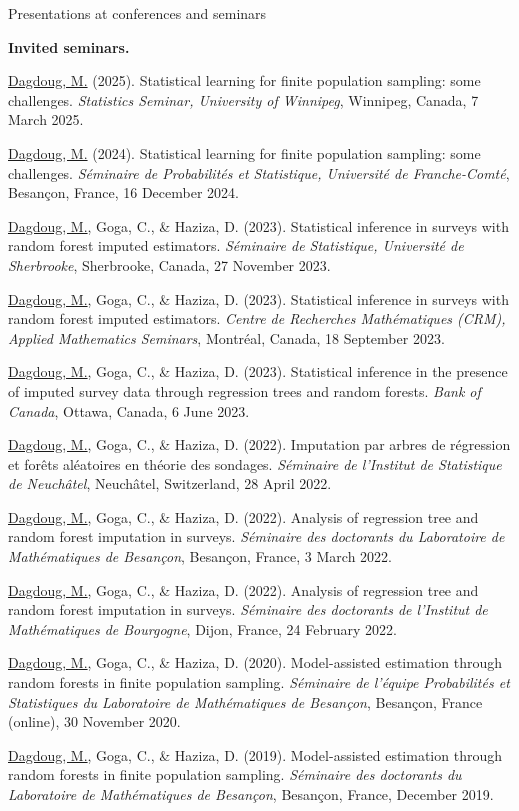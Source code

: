 \documentclass{resume}
\begin{document}
\begin{rSection}{Presentations at conferences and seminars}
\vspace{1mm}\hrulefill\vspace{1mm}

\textbf{Invited seminars.}
\begin{etaremune}
  \item \underline{Dagdoug, M.} (2025). Statistical learning for finite population sampling: some challenges. \textit{Statistics Seminar, University of Winnipeg}, Winnipeg, Canada, 7 March 2025.
  \item \underline{Dagdoug, M.} (2024). Statistical learning for finite population sampling: some challenges. \textit{Séminaire de Probabilités et Statistique, Université de Franche-Comté}, Besançon, France, 16 December 2024.
  \item \underline{Dagdoug, M.}, Goga, C., \& Haziza, D. (2023). Statistical inference in surveys with random forest imputed estimators. \textit{Séminaire de Statistique, Université de Sherbrooke}, Sherbrooke, Canada, 27 November 2023.
  \item \underline{Dagdoug, M.}, Goga, C., \& Haziza, D. (2023). Statistical inference in surveys with random forest imputed estimators. \textit{Centre de Recherches Mathématiques (CRM), Applied Mathematics Seminars}, Montréal, Canada, 18 September 2023.
  \item \underline{Dagdoug, M.}, Goga, C., \& Haziza, D. (2023). Statistical inference in the presence of imputed survey data through regression trees and random forests. \textit{Bank of Canada}, Ottawa, Canada, 6 June 2023.
  \item \underline{Dagdoug, M.}, Goga, C., \& Haziza, D. (2022). Imputation par arbres de régression et forêts aléatoires en théorie des sondages. \textit{Séminaire de l'Institut de Statistique de Neuchâtel}, Neuchâtel, Switzerland, 28 April 2022.
  \item \underline{Dagdoug, M.}, Goga, C., \& Haziza, D. (2022). Analysis of regression tree and random forest imputation in surveys. \textit{Séminaire des doctorants du Laboratoire de Mathématiques de Besançon}, Besançon, France, 3 March 2022.
  \item \underline{Dagdoug, M.}, Goga, C., \& Haziza, D. (2022). Analysis of regression tree and random forest imputation in surveys. \textit{Séminaire des doctorants de l'Institut de Mathématiques de Bourgogne}, Dijon, France, 24 February 2022.
  \item \underline{Dagdoug, M.}, Goga, C., \& Haziza, D. (2020). Model-assisted estimation through random forests in finite population sampling. \textit{Séminaire de l'équipe Probabilités et Statistiques du Laboratoire de Mathématiques de Besançon}, Besançon, France (online), 30 November 2020.
  \item \underline{Dagdoug, M.}, Goga, C., \& Haziza, D. (2019). Model-assisted estimation through random forests in finite population sampling. \textit{Séminaire des doctorants du Laboratoire de Mathématiques de Besançon}, Besançon, France, December 2019.
\end{etaremune}
\end{rSection}
\end{document}
